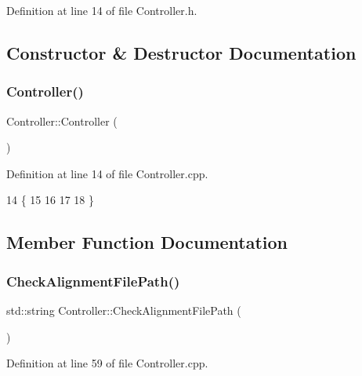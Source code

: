 Definition at line 14 of file Controller.\+h.



\subsection{Constructor \& Destructor Documentation}
\mbox{\label{classController_a95c56822d667e94b031451729ce069a9}} 
\subsubsection{\texorpdfstring{Controller()}{Controller()}}
{\footnotesize\ttfamily Controller\+::\+Controller (\begin{DoxyParamCaption}{ }\end{DoxyParamCaption})}



Definition at line 14 of file Controller.\+cpp.


\begin{DoxyCode}
14                       \{
15   
16   
17   
18 \}
\end{DoxyCode}


\subsection{Member Function Documentation}
\mbox{\label{classController_a79fd3abba4177d597d571a97032c6432}} 
\subsubsection{\texorpdfstring{Check\+Alignment\+File\+Path()}{CheckAlignmentFilePath()}}
{\footnotesize\ttfamily std\+::string Controller\+::\+Check\+Alignment\+File\+Path (\begin{DoxyParamCaption}{ }\end{DoxyParamCaption})}



Definition at line 59 of file Controller.\+cpp.


